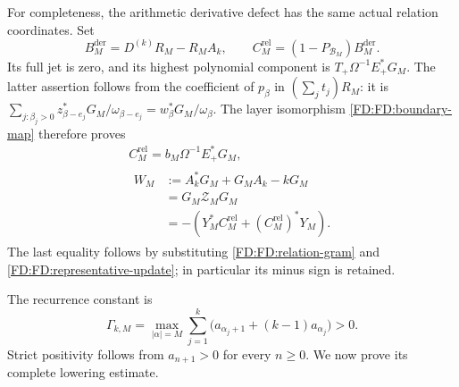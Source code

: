 For completeness, the arithmetic derivative defect has the same actual
relation coordinates.  Set
\[
B_M^{\mathrm{der}}=D^{(k)}R_M-R_MA_k,
\qquad C_M^{\mathrm{rel}}=(1-P_{\mathcal B_M})B_M^{\mathrm{der}}.
\]
Its full jet is zero, and its highest polynomial component is
\(T_+\Omega^{-1}E_+^*G_M\).  The latter assertion follows from the
coefficient of \(p_\beta\) in \((\sum_jt_j)R_M\): it is
\(\sum_{j:\beta_j>0}z_{\beta-e_j}^*G_M/\omega_{\beta-e_j}
=w_\beta^*G_M/\omega_\beta\).  The layer isomorphism
\eqref{FD:FD:boundary-map} therefore proves
\begin{equation}
\begin{gathered}
C_M^{\mathrm{rel}}=b_M\Omega^{-1}E_+^*G_M,\\
\begin{aligned}
W_M&:=A_k^*G_M+G_MA_k-kG_M\\
&=G_M\mathcal Z_MG_M\\
&=-(Y_M^*C_M^{\mathrm{rel}}+(C_M^{\mathrm{rel}})^*Y_M).
\end{aligned}
\end{gathered}
\tag{FD.19}\label{FD:FD:actual-control}
\end{equation}
The last equality follows by substituting
\eqref{FD:FD:relation-gram} and \eqref{FD:FD:representative-update}; in
particular its minus sign is retained.

The recurrence constant is
\begin{equation}
\Gamma_{k,M}=\max_{|\alpha|=M}\sum_{j=1}^k
\bigl(a_{\alpha_j+1}+(k-1)a_{\alpha_j}\bigr)>0.
\tag{FD.20}\label{FD:FD:Gamma}
\end{equation}
Strict positivity follows from \(a_{n+1}>0\) for every \(n\ge0\).
We now prove its complete lowering estimate.

